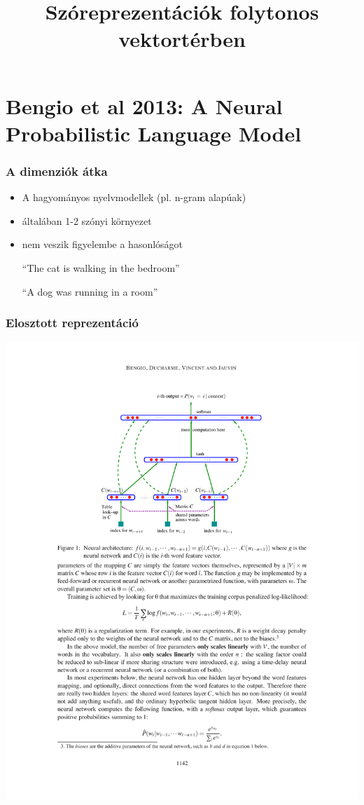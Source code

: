 \documentclass{beamer}
\title{Szóreprezentációk folytonos vektortérben}
\begin{document}
\begin{frame}
  \titlepage
\end{frame}

\section{Bengio et al 2013: A Neural Probabilistic Language Model}
\begin{frame}
\frametitle{A dimenziók átka}
\begin{itemize}
\item A hagyományos nyelvmodellek (pl. n-gram alapúak)

\item általában 1-2 szónyi környezet

\item nem veszik figyelembe a hasonlóságot

\medskip

“The cat is walking in the bedroom” 

“A dog was running in a room”
\end{itemize}

\end{frame}

\begin{frame}
\frametitle{Elosztott reprezentáció}
\includegraphics[width=\linewidth]{bengio-neural-archtecture.pdf}
\end{frame}
\end{document}
